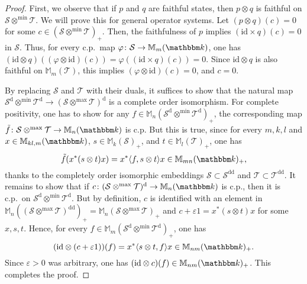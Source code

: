\documentclass[12pt]{amsart}
\theoremstyle{definition}
\begin{document}
\begin{proof}
First, we observe that if $p$ and $q$ are faithful states,
then $p\otimes q$ is faithful on ${{\mathcal S}}\otimes^{\min}{{\mathcal T}}$.
We will prove this for general operator systems.
Let $(p\otimes q)(c)=0$ for some $c\in({{\mathcal S}}\otimes^{\min}{{\mathcal T}})_+$.
Then, the faithfulness of $p$ implies $({\mathrm{id}}\times q)(c)=0$ in ${{\mathcal S}}$.
Thus, for every c.p.\ map ${\varphi}\colon {{\mathcal S}}\to{{\mathbb M}}_m({{\mathbbm k}})$, one has
$({\mathrm{id}}\otimes q)(({\varphi}\otimes{\mathrm{id}})(c))={\varphi}(({\mathrm{id}}\times q)(c))=0$.
Since ${\mathrm{id}}\otimes q$ is also faithful on ${{\mathbb M}}_m({{\mathcal T}})$, this implies
$({\varphi}\otimes{\mathrm{id}})(c)=0$, and $c=0$.

By replacing ${{\mathcal S}}$ and ${{\mathcal T}}$ with their duals,
it suffices to show that the natural
map ${{\mathcal S}}^{\mathrm{d}}\otimes^{\min}{{\mathcal T}}^{\mathrm{d}}\to({{\mathcal S}}\otimes^{\max}{{\mathcal T}})^{\mathrm{d}}$
is a complete order isomorphism.
For complete positivity, one has to show for any $f\in{{\mathbb M}}_n({{\mathcal S}}^{\mathrm{d}}\otimes^{\min}{{\mathcal T}}^{\mathrm{d}})_+$,
the corresponding map $\tilde{f}\colon{{\mathcal S}}\otimes^{\max}{{\mathcal T}}\to{{\mathbb M}}_n({{\mathbbm k}})$ is c.p.
But this is true, since for every $m,k,l$ and $x\in{{\mathbb M}}_{kl,m}({{\mathbbm k}})$, $s\in{{\mathbb M}}_k({{\mathcal S}})_+$,
and $t\in{{\mathbb M}}_l({{\mathcal T}})_+$, one has
\[
\tilde{f}(x^* (s\otimes t) x) = x^* {\mathopen{\langle}{f,s\otimes t}\mathclose{\rangle}} x \in {{\mathbb M}}_{mn}({{\mathbbm k}})_+,
\]
thanks to the completely order isomorphic embeddings
${{\mathcal S}}\subset{{\mathcal S}}^{{\mathrm{d}}{\mathrm{d}}}$ and ${{\mathcal T}}\subset{{\mathcal T}}^{{\mathrm{d}}{\mathrm{d}}}$.
It remains to show that if $c\colon({{\mathcal S}}\otimes^{\max}{{\mathcal T}})^{\mathrm{d}}\to{{\mathbb M}}_n({{\mathbbm k}})$ is c.p.,
then it is c.p.\ on ${{\mathcal S}}^{\mathrm{d}}\otimes^{\min}{{\mathcal T}}^{\mathrm{d}}$. But by definition, $c$ is
identified with an element in
${{\mathbb M}}_n(({{\mathcal S}}\otimes^{\max}{{\mathcal T}})^{{\mathrm{d}}{\mathrm{d}}})_+={{\mathbb M}}_n({{\mathcal S}}\otimes^{\max}{{\mathcal T}})_+$ and
$c+{\varepsilon}1=x^*(s\otimes t)x$ for some $x,s,t$.
Hence, for every $f\in {{\mathbb M}}_m({{\mathcal S}}^{\mathrm{d}}\otimes^{\min}{{\mathcal T}}^{\mathrm{d}})_+$, one has
\[
({\mathrm{id}}\otimes (c+{\varepsilon}1))(f)=x^*{\mathopen{\langle}{s\otimes t,f}\mathclose{\rangle}}x \in {{\mathbb M}}_{nm}({{\mathbbm k}})_+.
\]
Since ${\varepsilon}>0$ was arbitrary, one has $({\mathrm{id}}\otimes c)(f)\in {{\mathbb M}}_{nm}({{\mathbbm k}})_+$.
This completes the proof.
\end{proof}
\end{document}
